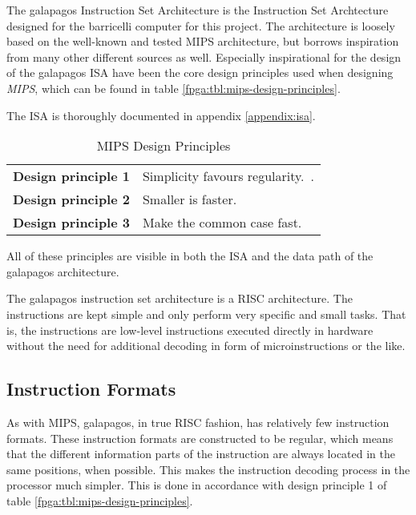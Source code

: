 The \Gls{galapagos} Instruction Set Architecture is the Instruction Set Archtecture designed for the \Gls{barricelli} computer for this project.
The architecture is loosely based on the well-known and tested MIPS architecture\cn, but borrows inspiration from many other different sources as well.
Especially inspirational for the design of the \Gls{galapagos} ISA have been the core design principles used when designing \emph{MIPS}, which can be found in table \vref{fpga:tbl:mips-design-principles}.

The ISA is thoroughly documented in appendix \vref{appendix:isa}.

\begin{table}[H]
\centering
    \begin{tabular}{l l} 
     \textbf{Design principle 1} & Simplicity favours regularity.~\cite[p.~79]{compOrgDes}. \\
     \textbf{Design principle 2} & Smaller is faster.~\cite[p.~81]{compOrgDes} \\
     \textbf{Design principle 3} & Make the common case fast.~\cite[p.~86]{compOrgDes} \\
    \hline
\end{tabular}
    \caption{MIPS Design Principles}
    \label{fpga:tbl:mips-design-principles}
\end{table}



All of these principles are visible in both the ISA and the data path of the \Gls{galapagos} architecture.

The \Gls{galapagos} instruction set architecture is a RISC architecture.
The instructions are kept simple and only perform very specific and small tasks.
That is, the instructions are low-level instructions executed directly in hardware without the need for additional decoding in form of microinstructions or the like.

\subsection{Instruction Formats}

As with \Gls{MIPS}, \Gls{galapagos}, in true \gls{RISC} fashion, has relatively few instruction formats.
These instruction formats are constructed to be regular, which means that the different information parts of the instruction are always located in the same positions, when possible.
This makes the instruction decoding process in the processor much simpler.
This is done in accordance with design principle 1 of table \vref{fpga:tbl:mips-design-principles}.

